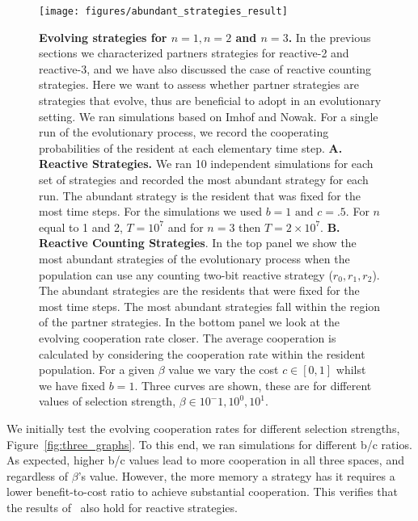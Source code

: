 \documentclass{article}
\theoremstyle{definition}
\begin{document}
\begin{figure}[h!]
  \centering
  \texttt{[image: figures/abundant\_strategies\_result]}
  \caption{\textbf{Evolving strategies for $n=1, n=2$ and $n=3$.} In the previous sections we
  characterized partners strategies for reactive-2 and reactive-3, and we
  have also discussed the case of reactive counting strategies. Here we want to
  assess whether partner strategies are strategies that evolve, thus are beneficial to
  adopt in an evolutionary setting. We ran simulations based on Imhof and Nowak.
  For a single run of the evolutionary process, we record the cooperating
  probabilities of the resident at each elementary time step.
  \textbf{A. Reactive Strategies.} We ran 10 independent simulations for each
  set of strategies and recorded the most abundant strategy for each run. The
  abundant strategy is the resident that was fixed for the most time steps. For
  the simulations we used \(b=1 \text{ and } c=.5\). For $n$ equal to 1 and
  2, \(T= 10 ^ 7\) and for $n=3$ then \(T= 2 \times10 ^ 7\).
  \textbf{B. Reactive Counting Strategies}. In the top panel we show the most abundant
  strategies of the evolutionary process when the population can use any
  counting two-bit reactive strategy ($r_0, r_1, r_2$). The abundant
  strategies are the residents that were fixed for the most time steps.
  The most abundant strategies fall within the region of the partner strategies.
  In the bottom panel we look at the evolving cooperation rate closer. The
  average cooperation is calculated by considering the cooperation rate within
  the resident population. For a given $\beta$ value we vary the cost $c \in [0, 1]$
  whilst we have fixed $b=1$. Three curves are shown, these are for different values
  of selection strength, $\beta \in {10^-1, 10^0, 10^1}$.}
\end{figure}

We initially test the evolving cooperation rates for different selection
strengths, Figure~\ref{fig:three_graphs}. To this end, we ran simulations for
different b/c ratios. As expected, higher b/c values lead to more cooperation in
all three spaces, and regardless of \(\beta\)'s value. However, the more memory
a strategy has it requires a lower benefit-to-cost ratio to achieve substantial
cooperation. This verifies that the results of~\citep{hilbe:PNAS:2017} also hold
for reactive strategies.
\end{document}
